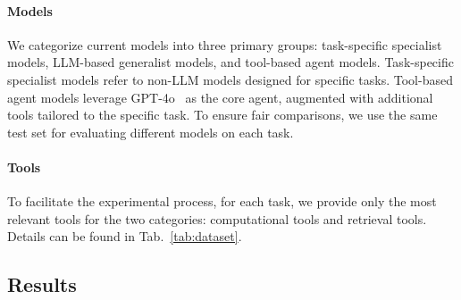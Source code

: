 \paragraph{Models}
We categorize current models into three primary groups: task-specific specialist models, LLM-based generalist models, and tool-based agent models. Task-specific specialist models refer to non-LLM models designed for specific tasks. Tool-based agent models leverage GPT-4o~\cite{openai2024gpt4ocard} as the core agent, augmented with additional tools tailored to the specific task. 
To ensure fair comparisons, we use the same test set for evaluating different models on each task.
\paragraph{Tools}
To facilitate the experimental process, for each task, we provide only the most relevant tools for the two categories: computational tools and retrieval tools. 
Details can be found in Tab.~\ref{tab:dataset}.

\subsection{Results}
